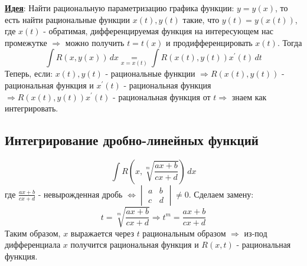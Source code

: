 \documentclass[12pt]{article}
\newcommand{\dd}{\, d}
\theoremstyle{definition}
\DeclareMathOperator{\dint}{\displaystyle\int}
\begin{document}
\textbf{\uline{Идея}}: Найти рациональную параметризацию графика функции: $y = y(x)$, то есть найти рациональные функции $x(t), y(t)$ такие, что $y(t) = y(x(t))$, где $x(t)$ - обратимая, дифференцируемая функция на интересующем нас промежутке $\Rightarrow$ можно получить $t = t(x)$ и продифференцировать $x(t)$. Тогда 
$$\dint R(x,y(x)) \dd x \underset{x = x(t)}{=} \dint R(x(t), y(t)) x^\prime(t) \dd t$$
Теперь, если: $x(t), y(t)$ - рациональные функции $\Rightarrow R(x(t),y(t))$ - рациональная функция и $x^\prime(t)$ - рациональная функция $\Rightarrow R(x(t), y(t)) x^\prime(t)$ - рациональная функция от $t \Rightarrow$ знаем как интегрировать.

\subsection*{Интегрирование дробно-линейных функций}
$$
	\dint R\left(x, \sqrt[m]{\dfrac{ax + b}{cx+d}} \right) \dd x
$$ 
где $\tfrac{ax + b}{cx+d}$ - невырожденная дробь $\Leftrightarrow \begin{vmatrix}	a & b \\ c & d \end{vmatrix} \neq 0$. Сделаем замену: 
$$
	t = \sqrt[m]{\dfrac{ax + b}{cx+d}} \Rightarrow t^m =\dfrac{ax + b}{cx+d} 
$$ 
Таким образом, $x$ выражается через $t$ рациональным образом $\Rightarrow$ из-под дифференциала $x$ получится рациональная функция и $R(x,t)$ - рациональная функция.
\end{document}
